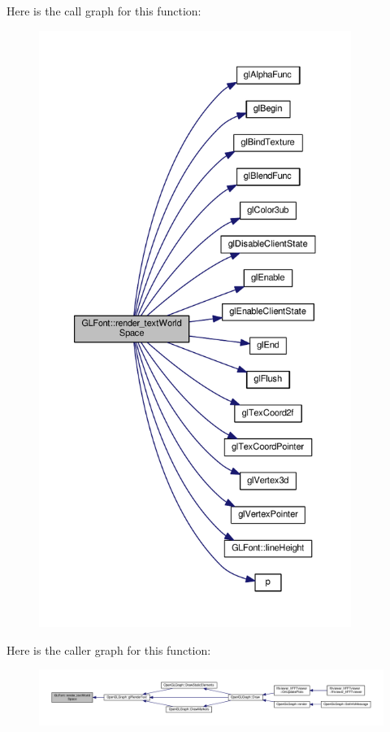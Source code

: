 Here is the call graph for this function\+:
\nopagebreak
\begin{figure}[H]
\begin{center}
\leavevmode
\includegraphics[height=550pt]{d8/d9b/classGLFont_a6386938ce029036c43216a512de5123b_cgraph}
\end{center}
\end{figure}




Here is the caller graph for this function\+:
\nopagebreak
\begin{figure}[H]
\begin{center}
\leavevmode
\includegraphics[width=350pt]{d8/d9b/classGLFont_a6386938ce029036c43216a512de5123b_icgraph}
\end{center}
\end{figure}


